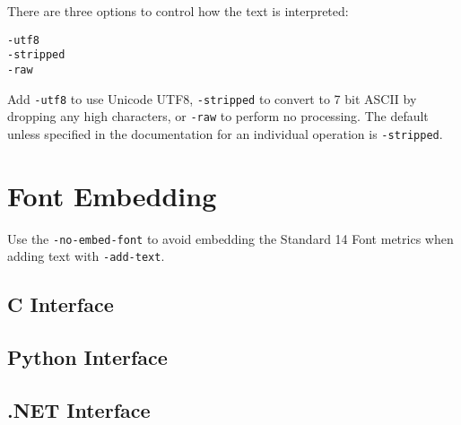 \documentclass{book}
\begin{document}
\noindent There are three options to control how the text is interpreted:

\begin{framed}
  \noindent\small\verb!-utf8!\\
  \noindent\small\verb!-stripped!\\
  \noindent\small\verb!-raw!
\end{framed}

\noindent Add \verb!-utf8! to use Unicode UTF8, \verb!-stripped! to convert to 7
bit ASCII by dropping any high characters, or \verb!-raw! to perform no
processing. The default unless specified in the documentation for an individual operation is \verb!-stripped!.

\section{Font Embedding}
Use the \texttt{-no-embed-font} to avoid embedding the Standard 14 Font metrics when adding text with \texttt{-add-text}.

\begin{cpdflib}
\clearpage
\section*{C Interface}
\begin{small}\tt


\end{small}
\end{cpdflib}

\begin{pycpdflib}
\clearpage
\section*{Python Interface}
\begin{small}\tt


\end{small}
\end{pycpdflib}

\begin{dotnetcpdflib}
\clearpage
\section*{.NET Interface}
\begin{small}\tt



\end{small}
\end{dotnetcpdflib}
\end{document}
